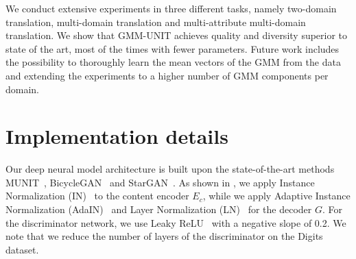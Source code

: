 \documentclass[runningheads]{llncs}
\begin{document}
We conduct extensive experiments in three different tasks, namely two-domain translation, multi-domain translation and multi-attribute multi-domain translation. We show that GMM-UNIT achieves quality and diversity superior to state of the art, most of the times with fewer parameters.
Future work includes the possibility to thoroughly learn the mean vectors of the GMM from the data and extending the experiments to a higher number of GMM components per domain.





\appendix 
\section{Implementation details}
\label{suppl:implementation}

Our deep neural model architecture is built upon the state-of-the-art methods MUNIT~\cite{huang2018multimodal}, BicycleGAN~\cite{zhu2017toward} and StarGAN~\cite{choi2018stargan}. 
As shown in , we apply Instance Normalization (IN)~\cite{ulyanov2017improved}
to the content encoder $E_c$, while we apply Adaptive Instance Normalization (AdaIN)~\cite{huang2017arbitrary} and Layer Normalization (LN)~\cite{ba2016layer} for the decoder $G$. For the discriminator network, we use Leaky ReLU~\cite{xu2015empirical} with a negative slope of 0.2. We note that we reduce the number of layers of the discriminator on the Digits dataset.
\end{document}
